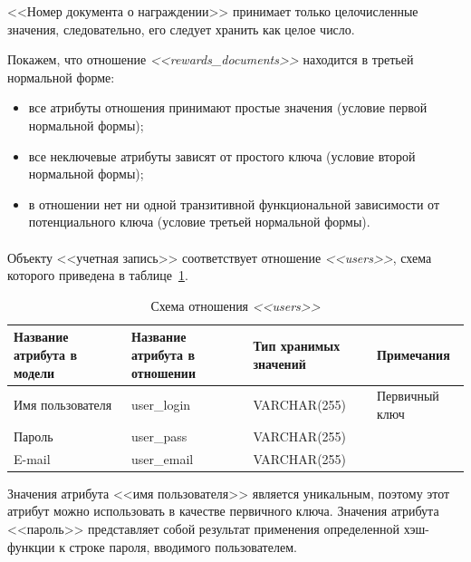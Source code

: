 <<Номер документа о награждении>> принимает только целочисленные значения, следовательно, его следует хранить как целое число.

Покажем, что отношение \textit{<<rewards\_documents>>} находится в
третьей нормальной форме:
\begin{itemize}
\item
все атрибуты отношения принимают простые значения
(условие первой нормальной формы);
\item
все неключевые атрибуты зависят от простого ключа
(условие второй нормальной формы);
\item
в отношении нет ни одной транзитивной функциональной зависимости 
от потенциального ключа (условие третьей нормальной формы).
\end{itemize}

\paragraph{}
Объекту <<учетная запись>> соответствует отношение \textit{<<users>>},
схема которого приведена в таблице~\ref{tbl:users_scheme}.

\begin{table}[h!]
  \caption{Схема отношения \textit{<<users>>}}
  \label{tbl:users_scheme}
  \small{
    \centering
    \begin{tabular}{| p{} | p{} | p{} | p{} |}
      \hline
      Название атрибута \newline в модели &
      Название атрибута \newline в отношении &
      Тип хранимых \newline значений &
      Примечания \\ \hline

      Имя пользователя &
      user\_login &
      VARCHAR(255) &
      Первичный ключ \\
      \hline

      Пароль &
      user\_pass &
      VARCHAR(255) & \\
      \hline

      E-mail &
      user\_email &
      VARCHAR(255) & \\
      \hline
    \end{tabular}
  }
\end{table}

Значения атрибута <<имя пользователя>> является уникальным, 
поэтому этот атрибут можно использовать в качестве первичного ключа.
Значения атрибута <<пароль>> представляет собой результат применения определенной хэш-функции
к строке пароля, вводимого пользователем.

